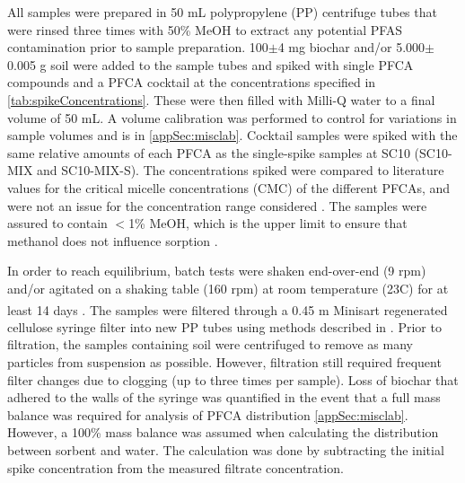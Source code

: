 All samples were prepared in 50 mL polypropylene (PP) centrifuge tubes that were rinsed three times with 50\% MeOH to extract any potential PFAS contamination prior to sample preparation. 100$\pm$4 mg biochar and/or 5.000$\pm$0.005 g soil were added to the sample tubes and spiked with single PFCA compounds and a PFCA cocktail at the concentrations specified in \cref{tab:spikeConcentrations}. These were then filled with Milli-Q water to a final volume of 50 mL. A volume calibration was performed to control for variations in sample volumes and is in \cref{appSec:misclab}. Cocktail samples were spiked with the same relative amounts of each PFCA as the single-spike samples at SC10 (SC10-MIX and SC10-MIX-S). The concentrations spiked were compared to literature values for the critical micelle concentrations (CMC) of the different PFCAs, and were not an issue for the concentration range considered \citep{bhhatarai2011,ding2013physicochemical}. The samples were assured to contain $<$1\% MeOH, which is the upper limit to ensure that methanol does not influence sorption \citep{arvaniti2014}.

In order to reach equilibrium, batch tests were shaken end-over-end (9 rpm) and/or agitated on a shaking table (160 rpm) at room temperature (23\textdegree C) for at least 14 days \citep{kupryianchyk2016biochar}. The samples were filtered through a 0.45 \textmu m Minisart\textsuperscript{\textregistered} regenerated cellulose syringe filter into new \acrshort{PP} tubes using methods described in \cite{Sorengard2019}. Prior to filtration, the samples containing soil were centrifuged to remove as many particles from suspension as possible. However, filtration still required frequent filter changes due to clogging (up to three times per sample). Loss of biochar that adhered to the walls of the syringe was quantified in the event that a full mass balance was required for analysis of PFCA distribution \cref{appSec:misclab}. However, a 100\% mass balance was assumed when calculating the distribution between sorbent and water. The calculation was done by subtracting the initial spike concentration from the measured filtrate concentration.

